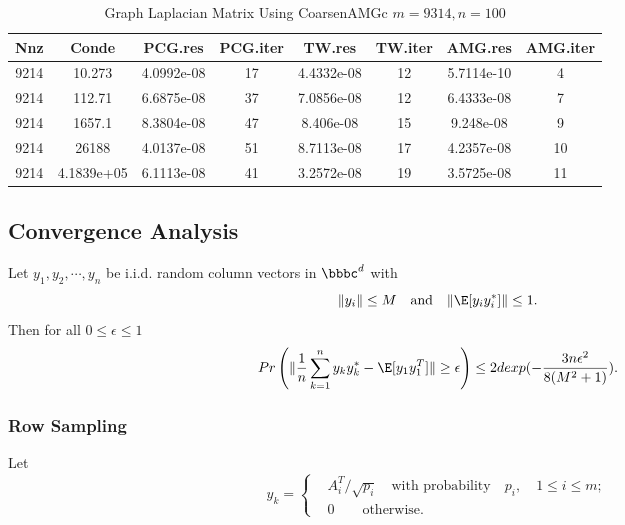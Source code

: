 \begin{table}\label{}
\caption{Graph Laplacian Matrix Using CoarsenAMGc $m = 9314,n=100$}
\begin{tabular}{|*{8}{c|}}\hline
  Nnz    &   Conde  &      PCG.res   &   PCG.iter     & TW.res  &    TW.iter    &   AMG.res &     AMG.iter \\\hline
9214     &   10.273  &   4.0992e-08   & 17       &   4.4332e-08  &  12         &5.7114e-10  &   4    \\\hline
    9214  &      112.71 &   6.6875e-08  &  37    &      7.0856e-08 &   12      &   6.4333e-08&     7   \\\hline
    9214  &      1657.1 &   8.3804e-08  &  47    &       8.406e-08 &   15    &   9.248e-08  &   9     \\\hline
    9214  &       26188 &    4.0137e-08  &  51   &       8.7113e-08  &  17     &   4.2357e-08  &  10   \\\hline
    9214  &  4.1839e+05 &   6.1113e-08   & 41   &       3.2572e-08  &  19     &    3.5725e-08 &   11  \\\hline
\end{tabular}
\end{table}






\subsection{Convergence Analysis}
\begin{theorem}
Let $y_1,y_2,\cdots,y_n$ be i.i.d. random column vectors in $\bbbc^d$ with
$$
\| y_i \| \leq M \quad \text{and} \quad \|\E[y_i y_i^*] \| \leq 1.
$$
Then for all $0 \leq \epsilon \leq 1$
$$
Pr \left( \| \frac{1}{n} \sum_{k=1}^n y_k y_k^* - \E [y_1 y_1^T] \| \geq \epsilon \right) \leq
2d exp(-\frac{3 n \epsilon^2}{8 (M^2+1)}).
$$
\end{theorem}

\subsubsection{Row Sampling}
Let
$$
y_k = \begin{cases} & A_i^T/ \sqrt{p_i}  \quad \text{with probability} \quad p_i, \quad 1 \leq i \leq m;  \\
                               & 0 \quad \quad \text{otherwise}.
        \end{cases}
$$

